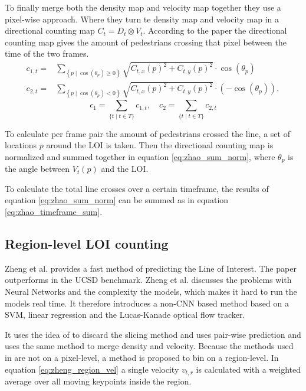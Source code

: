 To finally merge both the density map and velocity map together they use a pixel-wise approach. Where they turn te density map and velocity map in a directional counting map $C_t=D_t \otimes V_t$. According to the paper the directional counting map gives the amount of pedestrians crossing that pixel between the time of the two frames.
\begin{equation}
\begin{aligned}
c_{1, t} =& \sum_{\left\{p \mid \cos \left(\theta_{p}\right) \geq 0\right\}} \sqrt{C_{t, x}(p)^{2}+C_{t, y}(p)^{2}} \cdot \cos \left(\theta_{p}\right) \\
c_{2, t} =& \sum_{\left\{p \mid \cos \left(\theta_{p}\right)<0\right\}} \sqrt{C_{t, x}(p)^{2}+C_{t, y}(p)^{2}} \cdot\left(-\cos \left(\theta_{p}\right)\right),
\end{aligned}
\label{eq:zhao_sum_norm}
\end{equation}
\begin{equation}
c_{1}=\sum_{\{t \mid t \in T\}} c_{1, t}, \quad c_{2}=\sum_{\{t \mid t \in T\}} c_{2, t}
\label{eq:zhao_timeframe_sum}
\end{equation}

To calculate per frame pair the amount of pedestrians crossed the line, a set of locations $p$ around the LOI is taken. Then the directional counting map is normalized and summed together in equation \ref{eq:zhao_sum_norm}, where $\theta_p$ is the angle between $V_t(p)$ and the LOI.

To calculate the total line crosses over a certain timeframe, the results of equation \ref{eq:zhao_sum_norm} can be summed as in equation \ref{eq:zhao_timeframe_sum}.


\subsection{Region-level LOI counting}
Zheng et al. \cite{zheng_cross-line_2019} provides a fast method of predicting the Line of Interest. The paper outperforms \cite{leibe_crossing-line_2016} in the UCSD benchmark. Zheng et al. discusses the problems with Neural Networks and the complexity the models, which makes it hard to run the models real time. It therefore introduces a non-CNN based method based on a SVM, linear regression and the Lucas-Kanade optical flow tracker.

It uses the idea of \cite{leibe_crossing-line_2016} to discard the slicing method and uses pair-wise prediction and uses the same method to merge density and velocity. Because the methods used in \cite{zheng_cross-line_2019} are not on a pixel-level, a method is proposed to bin on a region-level. In equation \ref{eq:zheng_region_vel} a single velocity $v_{t,r}$ is calculated with a weighted average over all moving keypoints inside the region.

